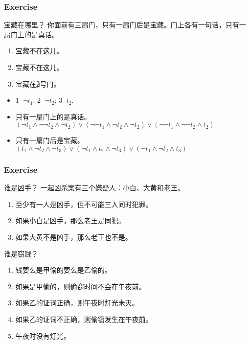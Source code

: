 \documentclass[UTF8,11pt,colorlinks,compress,openany]{beamer}%
\begin{document}
\begin{frame}\frametitle{Exercise}
\begin{block}{宝藏在哪里？}
你面前有三扇门，只有一扇门后是宝藏。门上各有一句话，只有一扇门上的是真话。
\begin{enumerate}
	\item 宝藏不在这儿。
	\item 宝藏不在这儿。
	\item 宝藏在\textcircled{\footnotesize 2}号门。
\end{enumerate}
\end{block}
\begin{itemize}
	\item \textcircled{\footnotesize 1} $\neg t_1$; \textcircled{\footnotesize 2} $\neg t_2$; \textcircled{\footnotesize 3} $t_2$.
	\item 只有一扇门上的是真话。
	$(\neg t_1\wedge\neg\neg t_2\wedge\neg t_2)\vee(\neg\neg t_1\wedge\neg t_2\wedge\neg t_2)\vee(\neg\neg t_1\wedge\neg\neg t_2\wedge t_2)$
	\item 只有一扇门后是宝藏。\\
	$(t_1\wedge\neg t_2\wedge\neg t_3)\vee(\neg t_1\wedge t_2\wedge\neg t_3)\vee(\neg t_1\wedge\neg t_2\wedge t_3)$
\end{itemize}
\end{frame}

\begin{frame}\frametitle{Exercise}
		\begin{block}{谁是凶手？}
			一起凶杀案有三个嫌疑人：小白、大黄和老王。
			\begin{enumerate}
				\item 至少有一人是凶手，但不可能三人同时犯罪。
				\item 如果小白是凶手，那么老王是同犯。
				\item 如果大黄不是凶手，那么老王也不是。
			\end{enumerate}
		\end{block}
		\begin{block}{谁是窃贼？}
			\begin{enumerate}
				\item 钱要么是甲偷的要么是乙偷的。
				\item 如果是甲偷的，则偷窃时间不会在午夜前。
				\item 如果乙的证词正确，则午夜时灯光未灭。
				\item 如果乙的证词不正确，则偷窃发生在午夜前。
				\item 午夜时没有灯光。
			\end{enumerate}
		\end{block}
\end{frame}
\end{document}
